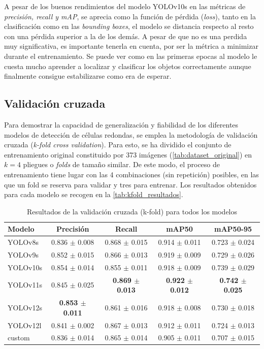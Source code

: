 \documentclass[12pt,a4paper,onecolumn,oneside]{report}
\begin{document}
A pesar de los buenos rendimientos del modelo YOLOv10s en las métricas de \textit{precisión, recall y mAP}, se aprecia como la función de pérdida (\textit{loss}), tanto en la clasificación como en las \textit{bounding boxes},
el modelo se distancia respecto al resto con una pérdida superior a la de los demás. A pesar de que no es una perdida muy significativa, es importante tenerla en cuenta, por ser la métrica a minimizar durante el entrenamiento.
Se puede ver como en las primeras epocas al modelo le cuesta mucho aprender a localizar y clasificar los objetos correctamente aunque finalmente consigue estabilizarse como era de esperar.

\subsection{Validación cruzada}
\label{sec:Validación cruzada}

Para demostrar la capacidad de generalización y fiabilidad de los diferentes modelos de detección de células redondas, se emplea la metodología
de validación cruzada (\textit{k-fold cross validation}). Para esto, se ha dividido el conjunto de entrenamiento original constituido por 373 imágenes (\autoref{tab:dataset_original}) en $k=4$ pliegues o \textit{folds} de tamaño similar.
De este modo, el proceso de entrenamiento tiene lugar con las 4 combinaciones (sin repetición) posibles, en las que un fold se reserva para validar y tres para entrenar. Los resultados obtenidos para cada modelo se recogen en la \autoref{tab:kfold_resultados}.

\begin{table}[htbp]
\caption{Resultados de la validación cruzada (k-fold) para todos los modelos}
\label{tab:kfold_resultados}
\centering
\begin{tabular}{lcccc}
\toprule
\textbf{Modelo} & \textbf{Precisión} & \textbf{Recall} & \textbf{mAP50} & \textbf{mAP50-95} \\
\midrule
YOLOv8s  & 0.836 $\pm$ 0.008 & 0.868 $\pm$ 0.015 & 0.914 $\pm$ 0.011 & 0.723 $\pm$ 0.024 \\
YOLOv9s  & 0.852 $\pm$ 0.015 & 0.866 $\pm$ 0.013 & 0.919 $\pm$ 0.009 & 0.729 $\pm$ 0.026 \\
YOLOv10s & 0.854 $\pm$ 0.014 & 0.855 $\pm$ 0.011 & 0.918 $\pm$ 0.009 & 0.739 $\pm$ 0.029 \\
YOLOv11s & 0.845 $\pm$ 0.025 & \textbf{0.869 $\pm$ 0.013} & \textbf{0.922 $\pm$ 0.012} & \textbf{0.742 $\pm$ 0.025} \\
YOLOv12s & \textbf{0.853 $\pm$ 0.011} & 0.861 $\pm$ 0.016 & 0.918 $\pm$ 0.008 & 0.730 $\pm$ 0.018 \\
YOLOv12l & 0.841 $\pm$ 0.002 & 0.867 $\pm$ 0.013 & 0.912 $\pm$ 0.011 & 0.724 $\pm$ 0.013 \\
custom    & 0.836 $\pm$ 0.014 & 0.865 $\pm$ 0.014 & 0.905 $\pm$ 0.011 & 0.707 $\pm$ 0.015 \\
\bottomrule
\end{tabular}
\end{table}
\end{document}

